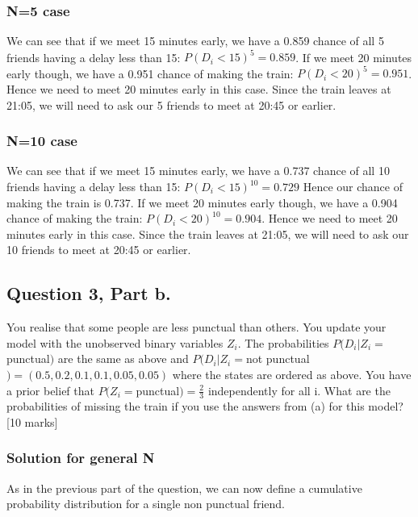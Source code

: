 \documentclass{article}
\begin{document}
\subsubsection{N=5 case}
We can see that if we meet 15 minutes early, we have a 0.859 chance of all 5 friends having a delay less than 15: $P(D_i < 15)^5 =0.859$.
\newline
\noindent
If we meet 20 minutes early though, we have a 0.951 chance of making the train: $P(D_i < 20)^5 =0.951$. Hence we need to meet 20 minutes early in this case.
\newline
\noindent
Since the train leaves at 21:05, we will need to ask our 5 friends to meet at 20:45 or earlier.

\subsubsection{N=10 case}
We can see that if we meet 15 minutes early, we have a 0.737 chance of all 10 friends having a delay less than 15: $P(D_i < 15)^{10} =0.729$ Hence our chance of making the train is 0.737.
\newline
\noindent
If we meet 20 minutes early though, we have a 0.904 chance of making the train: $P(D_i < 20)^{10} =0.904$. Hence we need to meet 20 minutes early in this case.
\newline
\noindent
Since the train leaves at 21:05, we will need to ask our 10 friends to meet at 20:45 or earlier.

\subsection{Question 3, Part b.}
You realise that some people are less punctual than others. You update your model with the unobserved binary variables $Z_i$.
The probabilities $P(D_i|Z_i = $punctual$)$ are the same as above and $P(D_i|Z_i = $not punctual$) = (0.5, 0.2, 0.1, 0.1, 0.05, 0.05)$ where the states are ordered as above. You have a prior belief that $P(Z_i = $punctual$) = \frac{2}{3}$
independently for all i. What are the probabilities of missing the train if you use the answers from (a) for this model? [10 marks]

\subsubsection{Solution for general N}
As in the previous part of the question, we can now define a cumulative probability distribution for a single non punctual friend.
\newline
\end{document}

